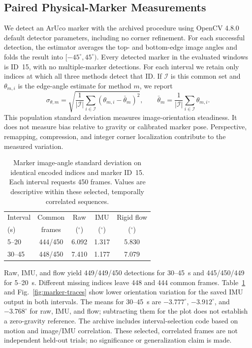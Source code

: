 \subsection{Paired Physical-Marker Measurements}
We detect an ArUco marker with the archived  procedure
using OpenCV 4.8.0 default detector parameters, including no corner refinement.
For each successful detection, the estimator averages the top- and bottom-edge
image angles and folds the result into $[-45^\circ,45^\circ)$. Every detected
marker in the evaluated windows is ID~15, with no multiple-marker detections.
For each interval we retain only indices at which all three methods detect
that ID. If $\mathcal I$ is this common set and $\theta_{m,i}$ is the edge-angle
estimate for method $m$, we report
\begin{equation}
 \sigma_{\theta,m}=\sqrt{\frac{1}{|\mathcal I|}
 \sum_{i\in\mathcal I}(\theta_{m,i}-\bar\theta_m)^2},
 \qquad
 \bar\theta_m=\frac{1}{|\mathcal I|}\sum_{i\in\mathcal I}\theta_{m,i}.
 \label{eq:markerstd}
\end{equation}
This population standard deviation measures image-orientation steadiness.
It does not measure bias relative to gravity or calibrated marker pose.
Perspective, remapping, compression, and integer corner localization contribute
to the measured variation.

\begin{table}[t]
\centering
\caption{Marker image-angle standard deviation on identical encoded indices
and marker ID~15. Each interval requests 450 frames. Values are descriptive
within these selected, temporally correlated sequences.}
\label{tab:marker-paired}
\small
\setlength{\tabcolsep}{4pt}
\begin{tabular}{lcccc}
\toprule
Interval & Common & Raw & IMU & Rigid flow \\
(s) & frames & ($^\circ$) & ($^\circ$) & ($^\circ$) \\
\midrule
5--20 & 444/450 & 6.092 & 1.317 & 5.830 \\
30--45 & 448/450 & 7.410 & 1.177 & 7.079 \\
\bottomrule
\end{tabular}
\end{table}

Raw, IMU, and flow yield 449/449/450 detections for 30--45~s and 445/450/449
for 5--20~s. Different missing indices leave 448 and 444 common frames.
Table~\ref{tab:marker-paired} and Fig.~\ref{fig:marker-traces} show lower
orientation variation for the saved IMU output in both intervals.
The means for 30--45~s are
$-3.777^\circ$, $-3.912^\circ$, and $-3.768^\circ$ for raw, IMU, and flow;
subtracting them for the plot does not establish a zero-gravity reference.
The archive includes interval-selection code based on motion and image/IMU
correlation. These selected, correlated frames are not independent held-out
trials; no significance or generalization claim is made.

